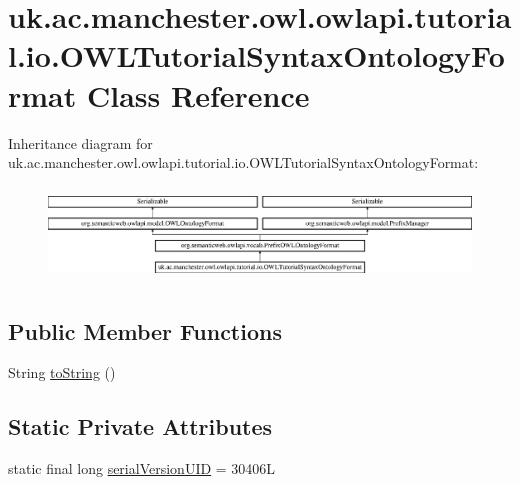 \hypertarget{classuk_1_1ac_1_1manchester_1_1owl_1_1owlapi_1_1tutorial_1_1io_1_1_o_w_l_tutorial_syntax_ontology_format}{\section{uk.\-ac.\-manchester.\-owl.\-owlapi.\-tutorial.\-io.\-O\-W\-L\-Tutorial\-Syntax\-Ontology\-Format Class Reference}
\label{classuk_1_1ac_1_1manchester_1_1owl_1_1owlapi_1_1tutorial_1_1io_1_1_o_w_l_tutorial_syntax_ontology_format}
}
Inheritance diagram for uk.\-ac.\-manchester.\-owl.\-owlapi.\-tutorial.\-io.\-O\-W\-L\-Tutorial\-Syntax\-Ontology\-Format\-:\begin{figure}[H]
\begin{center}
\leavevmode
\includegraphics[height=2.539683cm]{classuk_1_1ac_1_1manchester_1_1owl_1_1owlapi_1_1tutorial_1_1io_1_1_o_w_l_tutorial_syntax_ontology_format}
\end{center}
\end{figure}
\subsection*{Public Member Functions}
\begin{DoxyCompactItemize}
\item 
String \hyperlink{classuk_1_1ac_1_1manchester_1_1owl_1_1owlapi_1_1tutorial_1_1io_1_1_o_w_l_tutorial_syntax_ontology_format_ad6d34da59faee1c2d73708551fa73ba5}{to\-String} ()
\end{DoxyCompactItemize}
\subsection*{Static Private Attributes}
\begin{DoxyCompactItemize}
\item 
static final long \hyperlink{classuk_1_1ac_1_1manchester_1_1owl_1_1owlapi_1_1tutorial_1_1io_1_1_o_w_l_tutorial_syntax_ontology_format_a5d4c244d8e46e250172b8f0aaa549c6b}{serial\-Version\-U\-I\-D} = 30406\-L
\end{DoxyCompactItemize}
